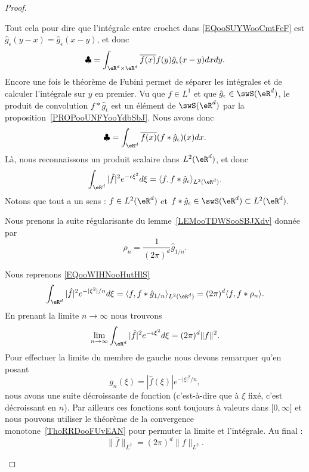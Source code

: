\begin{proof}
\begin{subproof}
		Tout cela pour dire que l'intégrale entre crochet dans \eqref{EQooSUYWooCmtFeF} est \( \hat g_{\epsilon}(y-x)=\hat g_{\epsilon}(x-y)\), et donc
		\begin{equation}
			\clubsuit=\int_{\eR^d\times \eR^d} \overline{ f(x) }f(y)  \hat g_{\epsilon}(x-y)  dxdy.
		\end{equation}
		Encore une fois le théorème de Fubini permet de séparer les intégrales et de calculer l'intégrale sur \( y\) en premier. Vu que \( f\in L^1\) et que \( \hat g_{\epsilon}\in \swS(\eR^d)\), le produit de convolution \( f*\hat g_{\epsilon}\) est un élément de \( \swS(\eR^d)\) par la proposition~\ref{PROPooUNFYooYdbSbJ}.
		Nous avons donc
		\begin{equation}
			\clubsuit=\int_{\eR^d}\overline{ f(x) }(f* \hat g_{\epsilon})(x)dx.
		\end{equation}
		Là, nous reconnaissons un produit scalaire dans \( L^2(\eR^d)\), et donc
		\begin{equation}        \label{EQooWIHNooHutHlS}
			\int_{\eR^d}| \hat f |^2 e^{-\epsilon\xi^2}d\xi=\langle f, f*\hat g_{\epsilon}\rangle_{L^2(\eR^d)}.
		\end{equation}
		Notons que tout a un sens : \( f\in L^2(\eR^d)\) et \( f*\hat g_{\epsilon}\in\swS(\eR^d)\subset L^2(\eR^d)\).


		Nous prenons la suite régularisante du lemme~\ref{LEMooTDWSooSBJXdv} donnée par
		\begin{equation}
			\rho_n=\frac{1}{ (2\pi)^d }\hat g_{1/n}.
		\end{equation}

		Nous reprenons \eqref{EQooWIHNooHutHlS}
		\begin{equation}
			\int_{\eR^d}| \hat f |^2 e^{-| \xi^2 |/n}d\xi=\langle f, f*\hat g_{1/n}\rangle_{L^2(\eR^d)}=(2\pi)^d\langle f, f* \rho_n \rangle .
		\end{equation}
		En prenant la limite \( n\to \infty\) nous trouvons
		\begin{equation}
			\lim_{n\to \infty}\int_{\eR^d}| \hat f |^2 e^{-\epsilon\xi^2}d\xi=(2\pi)^d\| f \|^2.
		\end{equation}
		Pour effectuer la limite du membre de gauche nous devons remarquer qu'en posant
		\begin{equation}
			g_n(\xi)=| \hat f(\xi) | e^{-| \xi |^2/n},
		\end{equation}
		nous avons une suite décroissante de fonction (c'est-à-dire que à \( \xi\) fixé, c'est décroissant en \(n\)). Par ailleurs ces fonctions sont toujours à valeurs dans \( \mathopen[ 0 , \infty \mathclose]\) et nous pouvons utiliser le théorème de la convergence monotone~\ref{ThoRRDooFUvEAN} pour permuter la limite et l'intégrale. Au final :
		\begin{equation}
			\| \hat f \|_{L^2}=(2\pi)^d\| f \|_{L^2}.
		\end{equation}
	\end{subproof}


\end{proof}
